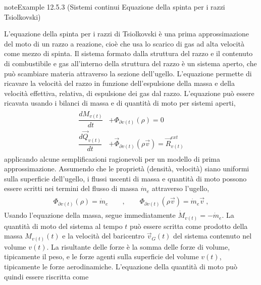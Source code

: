 \documentclass[letterpaper,10pt,italian]{jupyterBook}
\begin{document}
\begin{sphinxadmonition}{note}{Example 12.5.3 (Sistemi continui \sphinxhyphen{} Equazione della spinta per i razzi \sphinxhyphen{} Tsiolkovski)}



\sphinxAtStartPar
L’equazione della spinta per i razzi \sphinxhyphen{} di Tsiolkovski   \sphinxhyphen{} è una prima approssimazione del moto di un razzo a reazione, cioè che usa lo scarico di gas ad alta velocità come mezzo di spinta. Il sistema formato dalla struttura del razzo e il contenuto di combustibile e gas all’interno della struttura del razzo è un sistema aperto, che può scambiare materia attraverso la sezione dell’ugello. L’equazione permette di ricavare la velocità del razzo in funzione dell’espulsione della massa e della velocità effettiva, relativa, di espulsione dei gas dal razzo. L’equazione può essere ricavata usando i bilanci di massa e di quantità di moto per sistemi aperti,
\begin{equation*}
\begin{split}\begin{aligned}
  \dfrac{d M_{v(t)}}{dt} & + \Phi_{\partial v(t)}(\rho) = 0 \\
  \dfrac{d \vec{Q}_{v(t)}}{dt} & + \vec{\Phi}_{\partial v(t)}(\rho \vec{v}) = \vec{R}_{v(t)}^{ext}
\end{aligned}\end{split}
\end{equation*}
\sphinxAtStartPar
applicando alcune semplificazioni ragionevoli per un modello di prima approssimazione. Assumendo che le proprietà (densità, velocità) siano uniformi sulla superficie dell’ugello, i flussi uscenti di massa e quantità di moto possono essere scritti nei termini del flusso di massa \(\dot{m}_e\) attraverso l’ugello,
\begin{equation*}
\begin{split}\begin{aligned}
  \Phi_{\partial v(t)}(\rho) = \dot{m}_e \qquad , \qquad \Phi_{\partial v(t)}(\rho \vec{v}) = \dot{m}_e \vec{v} \ ,
\end{aligned}\end{split}
\end{equation*}
\sphinxAtStartPar
Usando l’equazione della massa, segue immediatamente \(\dot{M}_{v(t)} = - \dot{m}_e\).
La quantità di moto del sistema al tempo \(t\) può essere scritta come prodotto della massa \(M_{v(t)}(t)\) e la velocità del baricentro \(\vec{v}_G(t)\) del sistema contenuto nel volume \(v(t)\). La risultante delle forze è la somma delle forze di volume, tipicamente il peso, e le forze agenti sulla superficie del volume \(v(t)\), tipicamente le forze aerodinamiche. L’equazione della quantità di moto può quindi essere riscritta come

\end{sphinxadmonition}
\end{document}
